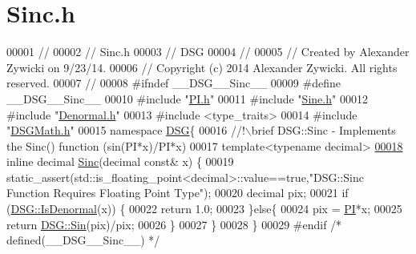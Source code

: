 \hypertarget{_sinc_8h_source}{\section{Sinc.\+h}
\label{_sinc_8h_source}
}

\begin{DoxyCode}
00001 \textcolor{comment}{//}
00002 \textcolor{comment}{//  Sinc.h}
00003 \textcolor{comment}{//  DSG}
00004 \textcolor{comment}{//}
00005 \textcolor{comment}{//  Created by Alexander Zywicki on 9/23/14.}
00006 \textcolor{comment}{//  Copyright (c) 2014 Alexander Zywicki. All rights reserved.}
00007 \textcolor{comment}{//}
00008 \textcolor{preprocessor}{#ifndef \_\_DSG\_\_Sinc\_\_}
00009 \textcolor{preprocessor}{#define \_\_DSG\_\_Sinc\_\_}
00010 \textcolor{preprocessor}{#include "\hyperlink{_p_i_8h}{PI.h}"}
00011 \textcolor{preprocessor}{#include "\hyperlink{_sine_8h}{Sine.h}"}
00012 \textcolor{preprocessor}{#include "\hyperlink{_denormal_8h}{Denormal.h}"}
00013 \textcolor{preprocessor}{#include <type\_traits>}
00014 \textcolor{preprocessor}{#include "\hyperlink{_d_s_g_math_8h}{DSGMath.h}"}
00015 \textcolor{keyword}{namespace }\hyperlink{namespace_d_s_g}{DSG}\{\textcolor{comment}{}
00016 \textcolor{comment}{    //!\(\backslash\)brief DSG::Sinc - Implements the Sinc() function (sin(PI*x)/PI*x)}
00017 \textcolor{comment}{}    \textcolor{keyword}{template}<\textcolor{keyword}{typename} decimal>
\hypertarget{_sinc_8h_source_l00018}{}\hyperlink{namespace_d_s_g_a6a99a1c242cddf18f4387f51ec8606b4}{00018}     \textcolor{keyword}{inline} decimal \hyperlink{namespace_d_s_g_a6a99a1c242cddf18f4387f51ec8606b4}{Sinc}(decimal \textcolor{keyword}{const}& x) \{
00019         static\_assert(std::is\_floating\_point<decimal>::value==\textcolor{keyword}{true},\textcolor{stringliteral}{"DSG::Sinc Function Requires Floating
       Point Type"});
00020         decimal pix;
00021         \textcolor{keywordflow}{if} (\hyperlink{namespace_d_s_g_a9eee3c39a1f45d42f0b4fa7201d3ba3d}{DSG::IsDenormal}(x)) \{
00022             \textcolor{keywordflow}{return} 1.0;
00023         \}\textcolor{keywordflow}{else}\{
00024             pix = \hyperlink{_p_i_8h_a598a3330b3c21701223ee0ca14316eca}{PI}*x;
00025             \textcolor{keywordflow}{return} \hyperlink{namespace_d_s_g_aad63d316081c7d13a551acf346ee2749}{DSG::Sin}(pix)/pix;
00026         \}
00027     \}
00028 \}
00029 \textcolor{preprocessor}{#endif }\textcolor{comment}{/* defined(\_\_DSG\_\_Sinc\_\_) */}\textcolor{preprocessor}{}
\end{DoxyCode}
